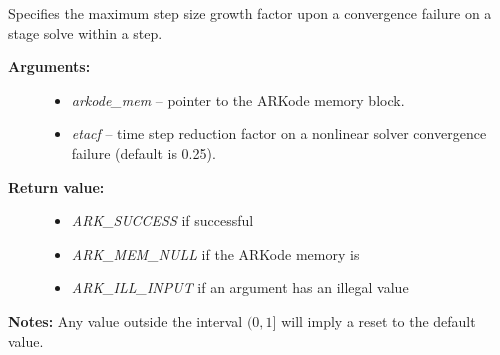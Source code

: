 \documentclass[letterpaper,10pt,english]{sphinxmanual}
\begin{document}
\begin{fulllineitems}
\label{c_interface/User_callable:c.ARKodeSetMaxCFailGrowth}
Specifies the maximum step size growth factor upon a convergence
failure on a stage solve within a step.
\begin{description}
\item[{\textbf{Arguments:}}] \leavevmode\begin{itemize}
\item {} 
\emph{arkode\_mem} -- pointer to the ARKode memory block.

\item {} 
\emph{etacf} -- time step reduction factor on a nonlinear solver
convergence failure (default is 0.25).

\end{itemize}

\item[{\textbf{Return value:}}] \leavevmode\begin{itemize}
\item {} 
\emph{ARK\_SUCCESS} if successful

\item {} 
\emph{ARK\_MEM\_NULL} if the ARKode memory is 

\item {} 
\emph{ARK\_ILL\_INPUT} if an argument has an illegal value

\end{itemize}

\end{description}

\textbf{Notes:} Any value outside the interval \((0,1]\) will imply a reset to the default value.

\end{fulllineitems}

\end{document}
